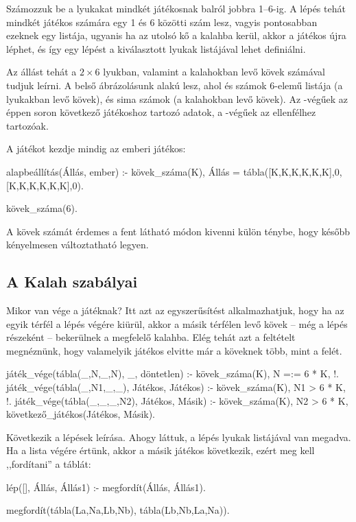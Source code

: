 Számozzuk be a lyukakat mindkét játékosnak balról
jobbra 1--6-ig. A lépés tehát mindkét játékos
számára egy 1 és 6 közötti szám lesz, vagyis
pontosabban ezeknek egy listája, ugyanis ha az
utolsó kő a kalahba kerül, akkor a játékos újra
léphet, és így egy lépést a kiválasztott lyukak
listájával lehet definiálni.

Az állást tehát a $2\times6$ lyukban, valamint a
kalahokban levő kövek számával tudjuk leírni. A
belső ábrázolásunk  alakú
lesz, ahol  és  számok 6-elemű listája
(a lyukakban levő kövek),  és  sima
számok (a kalahokban levő kövek). Az -végűek
az éppen soron következő játékoshoz tartozó adatok,
a -végűek az ellenfélhez tartozóak.

A játékot kezdje mindig az emberi játékos:
\begin{program}
alapbeállítás(Állás, ember) :-
    kövek_száma(K),
    Állás = tábla([K,K,K,K,K,K],0,
                  [K,K,K,K,K,K],0).

kövek_száma(6).
\end{program}

A kövek számát érdemes a fent látható módon kivenni
külön ténybe, hogy később kényelmesen változtatható
legyen.

\subsection*{A Kalah szabályai}
Mikor van vége a játéknak? Itt azt az egyszerűsítést
alkalmazhatjuk, hogy ha az egyik térfél a lépés
végére kiürül, akkor a másik térfélen levő kövek --
még a lépés részeként -- bekerülnek a megfelelő
kalahba. Elég tehát azt a feltételt megnéznünk, hogy
valamelyik játékos elvitte már a köveknek több, mint
a felét.
\begin{program}
játék_vége(tábla(_,N,_,N), _, döntetlen) :-
    kövek_száma(K), N =:= 6 * K, !.
játék_vége(tábla(_,N1,_,_), Játékos, Játékos) :-
    kövek_száma(K), N1 > 6 * K, !.
játék_vége(tábla(_,_,_,N2), Játékos, Másik) :-
    kövek_száma(K), N2 > 6 * K,
    következő_játékos(Játékos, Másik).
\end{program}

Következik a lépések leírása. Ahogy láttuk, a lépés
lyukak listájával van megadva. Ha a lista végére
értünk, akkor a másik játékos következik, ezért meg
kell ,,fordítani'' a táblát:
\begin{program}
lép([], Állás, Állás1) :- megfordít(Állás, Állás1).

megfordít(tábla(La,Na,Lb,Nb), tábla(Lb,Nb,La,Na)).
\end{program}

